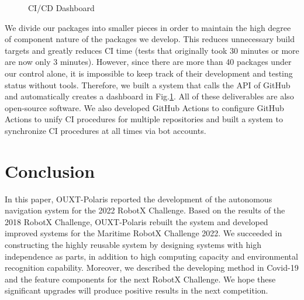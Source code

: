\documentclass[lettersize,journal]{IEEEtran}
\begin{document}
\begin{figure}[t]
    \begin{center}
  \end{center}
  \caption{CI/CD Dashboard}
  \label{fig:ci_cd_dashboard}
\end{figure}

We divide our packages into smaller pieces in order to maintain the high degree of component nature of the packages we develop.
This reduces unnecessary build targets and greatly reduces CI time (tests that originally took 30 minutes or more are now only 3 minutes).
However, since there are more than 40 packages under our control alone,
it is impossible to keep track of their development and testing status without tools.
Therefore, we built a system that calls the API of GitHub and automatically creates a dashboard in Fig.\ref{fig:ci_cd_dashboard}.
All of these deliverables are also open-source software.
We also developed GitHub Actions to configure GitHub Actions to unify CI procedures for multiple repositories and
built a system to synchronize CI procedures at all times via bot accounts. \cite{wam-v-tan_bot}

\section{Conclusion}
In this paper, OUXT-Polaris reported the development of the autonomous navigation system for the 2022 RobotX Challenge.
Based on the results of the 2018 RobotX Challenge, OUXT-Polaris rebuilt the system and
developed improved systems for the Maritime RobotX Challenge 2022.
We succeeded in constructing the highly reusable system by designing systems with high independence as parts,
in addition to high computing capacity and environmental recognition capability.
Moreover, we described the developing method in Covid-19 and the feature components for the next RobotX Challenge.
We hope these significant upgrades will produce positive results in the next competition.
\end{document}
